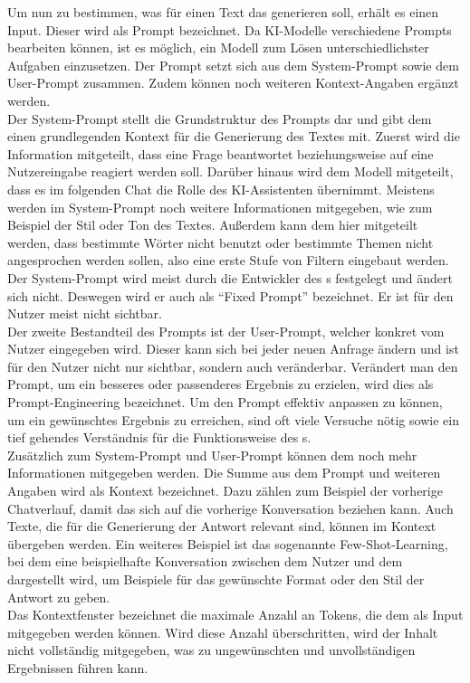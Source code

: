 \documentclass[../main.tex]{subfiles}
\begin{document}
Um nun zu bestimmen, was für einen Text das  generieren soll, erhält es einen Input. Dieser wird als Prompt bezeichnet. Da KI-Modelle verschiedene Prompts bearbeiten können, ist es 
möglich, ein Modell zum Lösen unterschiedlichster Aufgaben einzusetzen. Der Prompt setzt sich aus dem System-Prompt sowie dem User-Prompt zusammen. Zudem können noch weiteren Kontext-Angaben 
ergänzt werden.\cite{systemprompt}\\
Der System-Prompt stellt die Grundstruktur des Prompts dar und gibt dem  einen grundlegenden Kontext für die Generierung des Textes mit. Zuerst wird die Information mitgeteilt, dass eine 
Frage beantwortet beziehungsweise auf eine Nutzereingabe reagiert werden soll. Darüber hinaus wird dem Modell mitgeteilt, dass es im folgenden Chat die Rolle des KI-Assistenten übernimmt. 
Meistens werden im System-Prompt noch weitere Informationen mitgegeben, wie zum Beispiel der Stil oder Ton des Textes. Außerdem kann dem  hier mitgeteilt werden, dass bestimmte Wörter 
nicht benutzt oder bestimmte Themen nicht angesprochen werden sollen, also eine erste Stufe von Filtern eingebaut werden.\cite{systemprompt}\\
Der System-Prompt wird meist durch die Entwickler des s festgelegt und ändert sich nicht. Deswegen wird er auch als “Fixed Prompt” bezeichnet. Er ist für den Nutzer meist nicht sichtbar.\\
Der zweite Bestandteil des Prompts ist der User-Prompt, welcher konkret vom Nutzer eingegeben wird. Dieser kann sich bei jeder neuen Anfrage ändern und ist für den Nutzer nicht nur sichtbar, sondern 
auch veränderbar. Verändert man den Prompt, um ein besseres oder passenderes Ergebnis zu erzielen, wird dies als Prompt-Engineering bezeichnet. Um den Prompt effektiv anpassen zu können, um 
ein gewünschtes Ergebnis zu erreichen, sind oft viele Versuche nötig sowie ein tief gehendes Verständnis für die Funktionsweise des s.\cite{promptengineering}\\
Zusätzlich zum System-Prompt und User-Prompt können dem  noch mehr Informationen mitgegeben werden. Die Summe aus dem Prompt und weiteren Angaben wird als Kontext bezeichnet. Dazu zählen 
zum Beispiel der vorherige Chatverlauf, damit das  sich auf die vorherige Konversation beziehen kann. Auch Texte, die für die Generierung der Antwort relevant sind, können im Kontext 
übergeben werden. Ein weiteres Beispiel ist das sogenannte Few-Shot-Learning, bei dem eine  beispielhafte Konversation zwischen dem Nutzer und dem  dargestellt wird, um Beispiele für das 
gewünschte Format oder den Stil der Antwort zu geben.\\
Das Kontextfenster bezeichnet die maximale Anzahl an Tokens, die dem  als Input mitgegeben werden können. Wird diese Anzahl überschritten, wird der Inhalt nicht vollständig mitgegeben, 
was zu ungewünschten und unvollständigen Ergebnissen führen kann.
\end{document}
